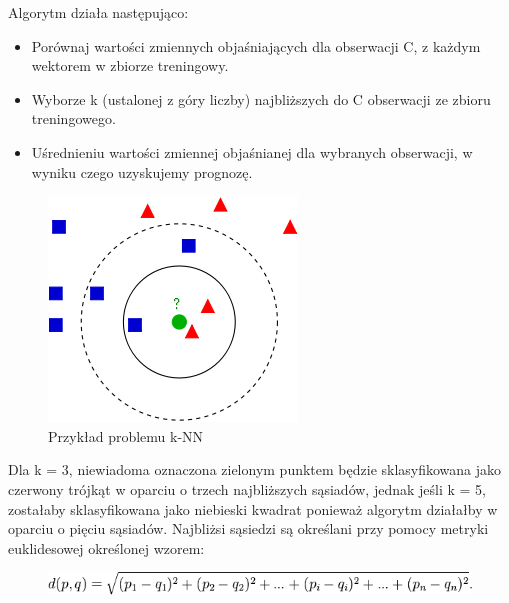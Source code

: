 \documentclass[brudnopis]{xmgr}
\begin{document}
Algorytm działa następująco:
\begin{itemize}
\item
Porównaj wartości zmiennych objaśniających dla obserwacji C, z każdym wektorem w zbiorze treningowy.
\item
Wyborze k (ustalonej z góry liczby) najbliższych do C obserwacji ze zbioru treningowego.
\item
Uśrednieniu wartości zmiennej objaśnianej dla wybranych obserwacji, w wyniku czego uzyskujemy prognozę.	
\end{itemize}	
     
\begin{figure}[!tbh]
\centering
\includegraphics[width=.6\hsize]{fig/knn}
\caption{Przykład problemu k-NN}
\end{figure}
\newpage
Dla k = 3, niewiadoma oznaczona zielonym punktem będzie sklasyfikowana jako czerwony trójkąt w oparciu o trzech najbliższych sąsiadów, jednak jeśli k = 5, zostałaby sklasyfikowana jako niebieski kwadrat ponieważ algorytm działałby w oparciu o pięciu sąsiadów. Najbliżsi sąsiedzi są określani przy pomocy metryki euklidesowej określonej wzorem:

\begin{figure}[!tbh]
\centering
\includegraphics[width=.8\hsize]{fig/knn-wzor}
\end{figure}
\end{document}
